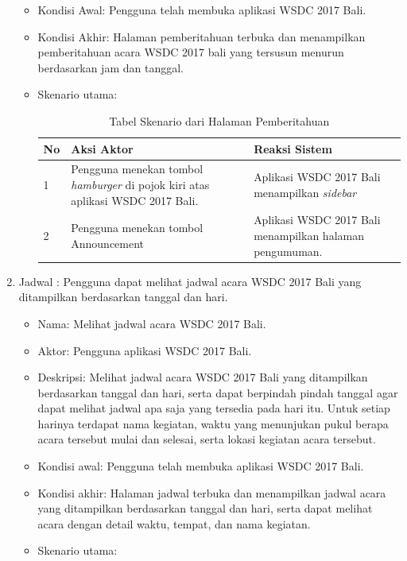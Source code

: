 \begin{enumerate}
\begin{itemize}
		\item Kondisi Awal: Pengguna telah membuka aplikasi WSDC 2017 Bali.
		\item Kondisi Akhir: Halaman pemberitahuan terbuka dan menampilkan pemberitahuan acara WSDC 2017 bali yang tersusun menurun berdasarkan jam dan tanggal.
		\item Skenario utama: \\
		\begin{table}[H]
			\centering
			\begin{tabular}{|p{0.5cm}|p{7cm}|p{7cm}|}
				\hline
				No & Aksi Aktor                               & Reaksi Sistem                                          \\ \hline
				1  & Pengguna menekan tombol {\it hamburger} di pojok kiri atas aplikasi WSDC 2017 Bali. & Aplikasi WSDC 2017 Bali menampilkan {\it sidebar} \\ \hline
				2  & Pengguna menekan tombol Announcement & Aplikasi WSDC 2017 Bali menampilkan halaman pengumuman. \\ \hline
			\end{tabular}
			\caption{Tabel Skenario dari Halaman Pemberitahuan}
			\label{table:skenarioHalamanPemberitahuan}
		\end{table}
	\end{itemize}
	\item Jadwal : Pengguna dapat melihat jadwal acara WSDC 2017 Bali yang ditampilkan berdasarkan tanggal dan hari.
	\begin{itemize}
		\item Nama: Melihat jadwal acara WSDC 2017 Bali.
		\item Aktor: Pengguna aplikasi WSDC 2017 Bali.
		\item Deskripsi: Melihat jadwal acara WSDC 2017 Bali yang ditampilkan berdasarkan tanggal dan hari, serta dapat berpindah pindah tanggal agar dapat melihat jadwal apa saja yang tersedia pada hari itu. Untuk setiap harinya terdapat nama kegiatan, waktu yang menunjukan pukul berapa acara tersebut mulai dan selesai, serta lokasi kegiatan acara tersebut.
		\item Kondisi awal: Pengguna telah membuka aplikasi WSDC 2017 Bali.
		\item Kondisi akhir: Halaman jadwal terbuka dan menampilkan jadwal acara yang ditampilkan berdasarkan tanggal dan hari, serta dapat melihat acara dengan detail waktu, tempat, dan nama kegiatan.
		\item Skenario utama: \\
		\begin{table}[H]

\end{table}
\end{itemize}
\end{enumerate}
